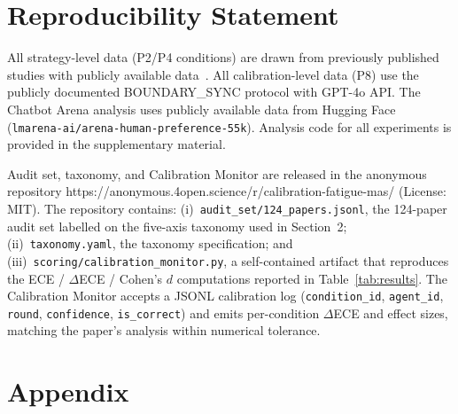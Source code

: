 \documentclass[11pt]{article}
\begin{document}
\section*{Reproducibility Statement}

All strategy-level data (P2/P4 conditions) are drawn from previously published studies with publicly available data~\cite{mmepc2026}. All calibration-level data (P8) use the publicly documented BOUNDARY\_SYNC protocol with GPT-4o API. The Chatbot Arena analysis uses publicly available data from Hugging Face (\texttt{lmarena-ai/arena-human-preference-55k}). Analysis code for all experiments is provided in the supplementary material.

Audit set, taxonomy, and Calibration Monitor are released in the anonymous repository https://anonymous.4open.science/r/calibration-fatigue-mas/ (License: MIT).
The repository contains: (i)~\texttt{audit\_set/124\_papers.jsonl}, the
124-paper audit set labelled on the five-axis taxonomy used in
Section~2; (ii)~\texttt{taxonomy.yaml}, the taxonomy specification;
and (iii)~\texttt{scoring/calibration\_monitor.py}, a self-contained artifact
that reproduces the ECE / $\Delta$ECE / Cohen's $d$ computations reported in
Table~\ref{tab:results}. The Calibration Monitor accepts a JSONL
calibration log (\texttt{condition\_id}, \texttt{agent\_id}, \texttt{round},
\texttt{confidence}, \texttt{is\_correct}) and emits per-condition
$\Delta$ECE and effect sizes, matching the paper's analysis within numerical
tolerance.




\appendix
\section{Appendix}
\end{document}
